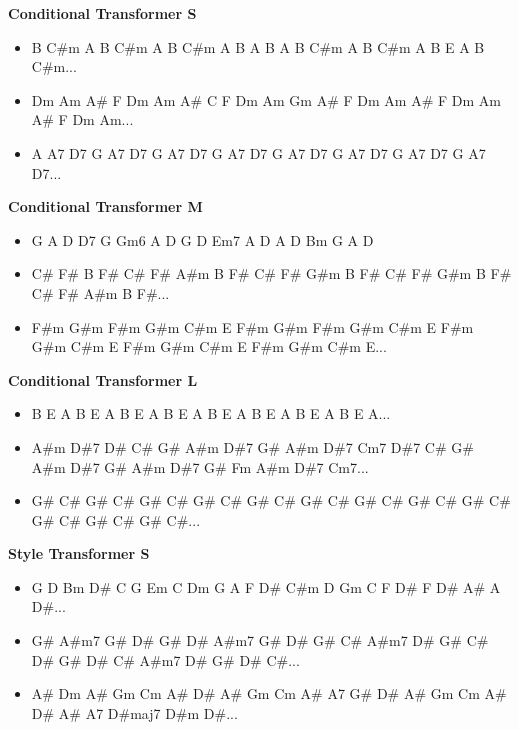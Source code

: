 \documentclass{article}
\begin{document}
\noindent \textbf{Conditional Transformer S}

\begin{itemize}[noitemsep,topsep=0pt]
    \item B C\#m A B C\#m A B C\#m A B A B A B C\#m A B C\#m A B E A B C\#m...
    \item Dm Am A\# F Dm Am A\# C F Dm Am Gm A\# F Dm Am A\# F Dm Am A\# F Dm Am...
    \item A A7 D7 G A7 D7 G A7 D7 G A7 D7 G A7 D7 G A7 D7 G A7 D7 G A7 D7...
\end{itemize}

\noindent \textbf{Conditional Transformer M}

\begin{itemize}[noitemsep,topsep=0pt]
    \item G A D D7 G Gm6 A D G D Em7 A D A D Bm G A D
    \item C\# F\# B F\# C\# F\# A\#m B F\# C\# F\# G\#m B F\# C\# F\# G\#m B F\# C\# F\# A\#m B F\#...
    \item F\#m G\#m F\#m G\#m C\#m E F\#m G\#m F\#m G\#m C\#m E F\#m G\#m C\#m E F\#m G\#m C\#m E F\#m G\#m C\#m E...
\end{itemize}

\noindent \textbf{Conditional Transformer L}

\begin{itemize}[noitemsep,topsep=0pt]
    \item B E A B E A B E A B E A B E A B E A B E A B E A...
    \item A\#m D\#7 D\# C\# G\# A\#m D\#7 G\# A\#m D\#7 Cm7 D\#7 C\# G\# A\#m D\#7 G\# A\#m D\#7 G\# Fm A\#m D\#7 Cm7...
    \item G\# C\# G\# C\# G\# C\# G\# C\# G\# C\# G\# C\# G\# C\# G\# C\# G\# C\# G\# C\# G\# C\# G\# C\#...
\end{itemize}

\noindent \textbf{Style Transformer S}

\begin{itemize}[noitemsep,topsep=0pt]
    \item G D Bm D\# C G Em C Dm G A F D\# C\#m D Gm C F D\# F D\# A\# A D\#...
    \item G\# A\#m7 G\# D\# G\# D\# A\#m7 G\# D\# G\# C\# A\#m7 D\# G\# C\# D\# G\# D\# C\# A\#m7 D\# G\# D\# C\#...
    \item A\# Dm A\# Gm Cm A\# D\# A\# Gm Cm A\# A7 G\# D\# A\# Gm Cm A\# D\# A\# A7 D\#maj7 D\#m D\#...
\end{itemize}
\end{document}
